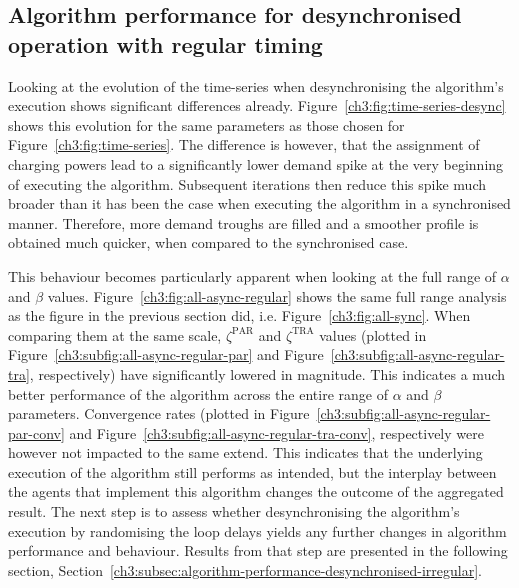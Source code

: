 \subsection{Algorithm performance for desynchronised operation with regular timing}
\label{ch3:subsec:algorithm-performance-desynchronised-regular}



Looking at the evolution of the time-series when desynchronising the algorithm's execution shows significant differences already.
Figure~\ref{ch3:fig:time-series-desync} shows this evolution for the same parameters as those chosen for Figure~\ref{ch3:fig:time-series}.
The difference is however, that the assignment of charging powers lead to a significantly lower demand spike at the very beginning of executing the algorithm.
Subsequent iterations then reduce this spike much broader than it has been the case when executing the algorithm in a synchronised manner.
Therefore, more demand troughs are filled and a smoother profile is obtained much quicker, when compared to the synchronised case.



This behaviour becomes particularly apparent when looking at the full range of $\alpha$ and $\beta$ values.
Figure~\ref{ch3:fig:all-async-regular} shows the same full range analysis as the figure in the previous section did, i.e. Figure~\ref{ch3:fig:all-sync}.
When comparing them at the same scale, $\zeta^\text{PAR}$ and $\zeta^\text{TRA}$ values (plotted in Figure~\ref{ch3:subfig:all-async-regular-par} and Figure~\ref{ch3:subfig:all-async-regular-tra}, respectively) have significantly lowered in magnitude.
This indicates a much better performance of the algorithm across the entire range of $\alpha$ and $\beta$ parameters.
Convergence rates (plotted in Figure~\ref{ch3:subfig:all-async-regular-par-conv} and Figure~\ref{ch3:subfig:all-async-regular-tra-conv}, respectively were however not impacted to the same extend.
This indicates that the underlying execution of the algorithm still performs as intended, but the interplay between the agents that implement this algorithm changes the outcome of the aggregated result.
The next step is to assess whether desynchronising the algorithm's execution by randomising the loop delays yields any further changes in algorithm performance and behaviour.
Results from that step are presented in the following section, Section~\ref{ch3:subsec:algorithm-performance-desynchronised-irregular}.

